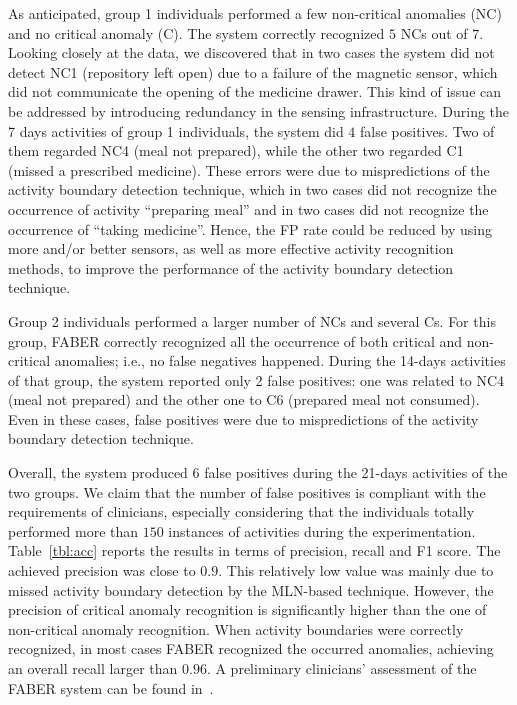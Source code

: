 \documentclass[10pt, conference, compsocconf]{IEEEtran}
\begin{document}
As anticipated, group 1 individuals performed a few non-critical anomalies
(NC) and no critical anomaly (C). The system correctly recognized $5$ NCs
out of $7$. Looking closely at the data, we discovered that in two cases the
system did not detect NC1 (repository left open) due to a failure of the
magnetic sensor, which did not communicate the opening of the medicine 
drawer. This kind of issue can be addressed by introducing redundancy in
the sensing infrastructure. 
During the 7 days activities of group 1 individuals, the system
did $4$ false positives. Two of them regarded NC4 (meal not prepared), while
the other two regarded C1 (missed a prescribed medicine). These errors were 
due to mispredictions of the activity boundary detection technique, which
in two cases did not recognize the occurrence of activity ``preparing meal''
and in two cases did not recognize the occurrence of ``taking medicine''. 
Hence, the FP rate could be reduced by using more and/or better sensors,
as well as more effective activity recognition methods, to
improve the performance of the activity boundary detection technique.

Group 2 individuals performed a larger number of NCs and several Cs.
For this group, FABER correctly recognized all the occurrence of both
critical and non-critical anomalies; i.e., no false negatives happened. 
During the 14-days activities of that group, the system reported only 2 false 
positives: one was related to NC4 (meal not prepared) and the other one 
to C6 (prepared meal not consumed). Even in these cases, false positives 
were due to mispredictions of the activity boundary detection technique. 

Overall, the system produced 6 false positives during the 21-days activities
of the two groups. We claim that the number of false positives is compliant 
with the requirements of clinicians, especially considering that the 
individuals totally performed more than $150$ instances of activities 
during the experimentation.
Table~\ref{tbl:acc} reports the results in terms of precision, recall
and F1 score. The achieved precision was close to $0.9$. This relatively low 
value was mainly due to missed activity boundary detection by the MLN-based 
technique. However, the precision of critical anomaly
recognition is significantly higher than the one of non-critical anomaly
recognition. 
When activity boundaries were correctly recognized, in most cases FABER 
recognized the occurred anomalies, achieving an overall recall
larger than $0.96$.
A preliminary clinicians' assessment of the FABER system can be found
in~\cite{smarte15}.
\end{document}
